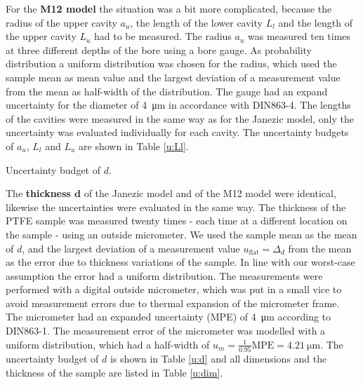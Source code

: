 For the \textbf{M12 model} the situation was a bit more complicated, because the radius of the upper cavity $a_u$, the length of the lower cavity $L_l$ and the length of the upper cavity $L_u$ had to be measured. The radius $a_u$ was measured ten times at three different depths of the bore using a bore gauge. As probability distribution a uniform distribution was chosen for the radius, which used the sample mean as mean value and the largest deviation of a measurement value from the mean as half-width of the distribution. The gauge had an expand uncertainty for the diameter of \SI{4}{\micro\meter} in accordance with DIN863-4. The lengths of the cavities were measured in the same way as for the Janezic model, only the uncertainty was evaluated individually for each cavity. The uncertainty budgets of $a_u$, $L_l$ and $L_u$ are shown in Table \ref{u:Ll}.

\begin{table}[ht]
\centering
\uncertd
{}
\caption{Uncertainty budget of $d$.}\label{u:d}
\end{table}

The \textbf{thickness $\mathbf{d}$} of the Janezic model and of the M12 model were identical, likewise the uncertainties were evaluated in the same way. The thickness of the PTFE sample was measured twenty times - each time at a different location on the sample - using an outside micrometer. We used the sample mean as the mean of $d$, and the largest deviation of a measurement value $u_\text{flat}=\Delta_d$ from the mean as the error due to thickness variations of the sample. In line with our worst-case assumption the error had a uniform distribution. The measurements were performed with a digital outside micrometer, which was put in a small vice to avoid measurement errors due to thermal expansion of the micrometer frame. The micrometer had an expanded uncertainty (MPE) of \SI{4}{\micro\meter} according to DIN863-1. The measurement error of the micrometer was modelled with a uniform distribution, which had a half-width of $u_m=\frac{1}{0.95}\text{MPE}=\SI{4.21}{\micro\meter}$. The uncertainty budget of $d$ is shown in Table \ref{u:d} and all dimensions and the thickness of the sample are listed in Table \ref{u:dim}. 

